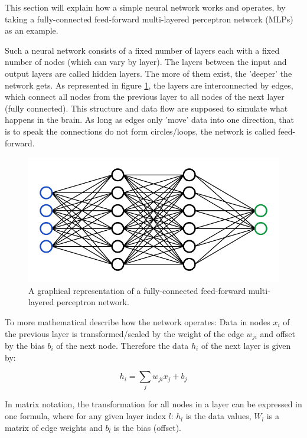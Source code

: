 \documentclass[a4paper,10pt]{scrartcl}
\begin{document}
This section will explain how a simple neural network works and operates, by taking a fully-connected feed-forward multi-layered perceptron network (MLPs) as an example.

Such a neural network consists of a fixed number of layers each with a fixed number of nodes (which can vary by layer).
The layers between the input and output layers are called hidden layers.
The more of them exist, the 'deeper' the network gets.
As represented in figure \ref{fig:neuralnetwork}, the layers are interconnected by edges, which connect all nodes from the previous layer to all nodes of the next layer (fully connected).
This structure and data flow are supposed to simulate what happens in the brain.
As long as edges only 'move' data into one direction, that is to speak the connections do not form circles/loops, the network is called feed-forward.

\begin{figure}[h]
    \includegraphics[scale=0.5]{images/neuralnetwork.png}
    \centering
    \caption{A graphical representation of a fully-connected feed-forward multi-layered perceptron network.}
    \label{fig:neuralnetwork}
\end{figure}

To more mathematical describe how the network operates: Data in nodes $x_i$ of the previous layer is transformed/scaled by the weight of the edge $w_{ji}$ and offset by the bias $b_i$ of the next node.
Therefore the data $h_i$ of the next layer is given by:

\begin{equation}
    h_i = \sum_j{w_{ji}x_j} + b_j
\end{equation}

In matrix notation, the transformation for all nodes in a layer can be expressed in one formula, where for any given layer index $l$: $h_l$ is the data values, $W_l$ is a matrix of edge weights and $b_l$ is the bias (offset).
\end{document}
